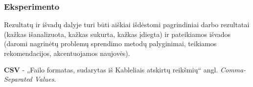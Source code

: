 \documentclass{VUMIFPSkursinis}
\begin{document}
\subsubsection{Eksperimento}


Rezultatų ir išvadų dalyje turi būti aiškiai išdėstomi pagrindiniai darbo
rezultatai (kažkas išanalizuota, kažkas sukurta, kažkas įdiegta) ir pateikiamos
išvados (daromi nagrinėtų problemų sprendimo metodų palyginimai, teikiamos
rekomendacijos, akcentuojamos naujovės).

\printbibliography[heading=bibintoc]

\begin{itemize}

\end{itemize}
\textbf{CSV} - „Failo formatas, sudarytas iš Kableliais atskirtų reikšmių“ angl. \textit{Comma-Separated Values}.\par

\appendix
\end{document}
